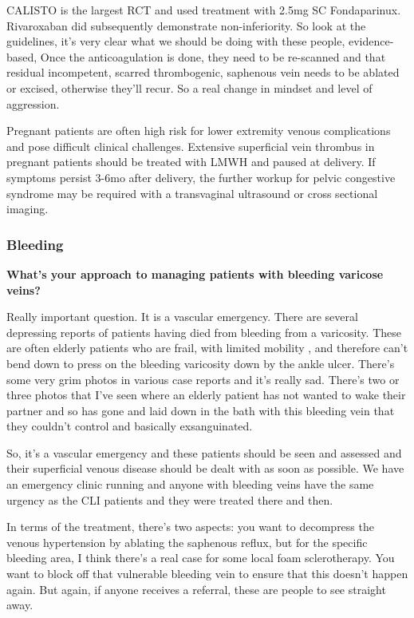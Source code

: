 \documentclass[
]{book}
\begin{document}
CALISTO is the largest RCT and used treatment with 2.5mg SC
Fondaparinux.\citep{calistostudygroup2010, blondon2012} Rivaroxaban did
subsequently demonstrate non-inferiority.\citep{werth2016} So look at the
guidelines, it's very clear what we should be doing with these people,
evidence-based, Once the anticoagulation is done, they need to be
re-scanned and that residual incompetent, scarred thrombogenic,
saphenous vein needs to be ablated or excised, otherwise they'll recur.
So a real change in mindset and level of aggression.\citep{kakkos2021, dinisio2018, scovell2018}

Pregnant patients are often high risk for lower extremity venous
complications and pose difficult clinical challenges. Extensive
superficial vein thrombus in pregnant patients should be treated with
LMWH and paused at delivery.\citep{kupelian2007, litzendorf2011} If symptoms
persist 3-6mo after delivery, the further workup for pelvic congestive
syndrome may be required with a transvaginal ultrasound or cross
sectional imaging.\citep{labropoulos2017}

\hypertarget{bleeding}{%
\subsubsection{Bleeding}\label{bleeding}}

\textbf{What's your approach to managing patients with bleeding varicose
veins?}

Really important question. It is a vascular emergency. There are several
depressing reports of patients having died from bleeding from a
varicosity. These are often elderly patients who are frail, with limited
mobility , and therefore can't bend down to press on the bleeding
varicosity down by the ankle ulcer. There's some very grim photos in
various case reports and it's really sad. There's two or three photos
that I've seen where an elderly patient has not wanted to wake their
partner and so has gone and laid down in the bath with this bleeding
vein that they couldn't control and basically exsanguinated.

So, it's a vascular emergency and these patients should be seen and
assessed and their superficial venous disease should be dealt with as
soon as possible. We have an emergency clinic running and anyone with
bleeding veins have the same urgency as the CLI patients and they were
treated there and then.

In terms of the treatment, there's two aspects: you want to decompress
the venous hypertension by ablating the saphenous reflux, but for the
specific bleeding area, I think there's a real case for some local foam
sclerotherapy. You want to block off that vulnerable bleeding vein to
ensure that this doesn't happen again. But again, if anyone receives a
referral, these are people to see straight away.
\end{document}
